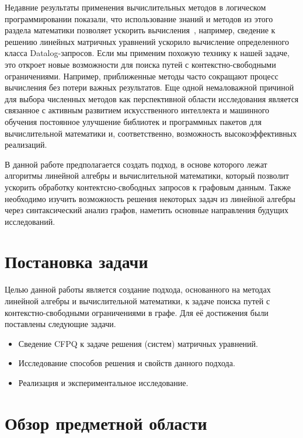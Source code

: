 \documentclass[12pt]{matmex-diploma-custom}
\begin{document}
Недавние результаты применения вычислительных методов в логическом программировании показали, что использование знаний и методов из этого раздела математики позволяет ускорить вычисления~\cite{aspis2018linear, sato2017linear}, например, сведение к решению линейных матричных уравнений ускорило вычисление определенного класса Datalog-запросов. 
Если мы применим похожую технику к нашей задаче, это откроет новые возможности для поиска путей с контекстно-свободными ограничениями. 
Например, приближенные методы часто сокращают процесс вычисления без потери важных результатов. 
Еще одной немаловажной причиной для выбора численных методов как перспективной области исследования является связанное с активным развитием искусственного интеллекта и машинного обучения постоянное улучшение библиотек и программных пакетов для вычислительной математики и, соответственно, возможность высокоэффективных реализаций.

В данной работе предполагается создать подход, в основе которого лежат алгоритмы линейной алгебры и вычислительной математики, который позволит ускорить обработку контектсно-свободных запросов к графовым данным. Также необходимо изучить возможность решения некоторых задач из линейной алгебры через синтаксический анализ графов, наметить основные направления будущих исследований.



\section{Постановка задачи}

Целью данной работы является создание подхода, основанного на методах линейной алгебры и вычислительной математики, к задаче поиска путей с контекстно-свободными ограничениями в графе.
Для её достижения были поставлены следующие задачи.

\begin{itemize}
	\item Сведение CFPQ к задаче решения (систем) матричных уравнений.
    \item Исследование способов решения и свойств данного подхода.
    \item Реализация и экспериментальное исследование.
\end{itemize}
	

\section{Обзор предметной области}
\end{document}
